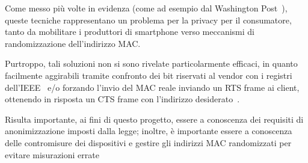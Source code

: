 

Come messo più volte in evidenza (come ad esempio dal Washington Post~\cite{Fung2013}), queste tecniche rappresentano un problema per la privacy per il consumatore,
tanto da mobilitare i produttori di smartphone verso meccanismi di randomizzazione dell'indirizzo MAC\@.

Purtroppo, tali soluzioni non si sono rivelate particolarmente efficaci, in quanto facilmente aggirabili
tramite confronto dei bit riservati al vendor con i registri dell'IEEE~\cite{Claburn2017} e/o forzando l'invio del MAC reale inviando un RTS frame ai client, ottenendo in risposta un CTS frame con l'indirizzo desiderato~\cite{Martin2017}.


Risulta importante, ai fini di questo progetto, essere a conoscenza dei requisiti di anonimizzazione imposti dalla legge;
inoltre, è importante essere a conoscenza delle contromisure dei dispositivi e gestire gli indirizzi MAC randomizzati per evitare misurazioni errate
